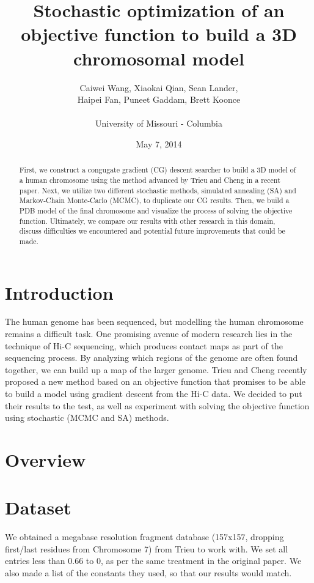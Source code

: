 \documentclass{article}
\title{Stochastic optimization of an objective function to build a 3D chromosomal model}
\author{Caiwei Wang, Xiaokai Qian, Sean Lander, \\Haipei Fan, Puneet Gaddam, Brett Koonce\\\\University of Missouri - Columbia}
\date{May 7, 2014}
\begin{document}
\maketitle

\renewcommand{\abstractname}{}
\begin{abstract}

First, we construct a congugate gradient (CG) descent searcher to build a 3D model of a human chromosome using the method advanced by Trieu and Cheng in a recent paper.  Next, we utilize two different stochastic methods, simulated annealing (SA) and Markov-Chain Monte-Carlo (MCMC), to duplicate our CG results.  Then, we build a PDB model of the final chromosome and visualize the process of solving the objective function.  Ultimately, we compare our results with other research in this domain, discuss difficulties we encountered and potential future improvements that could be made.

\end{abstract}

\section{Introduction}

The human genome has been sequenced, but modelling the human chromosome remains a difficult task.  One promising avenue of modern research lies in the technique of Hi-C sequencing, which produces contact maps as part of the sequencing process.  By analyzing which regions of the genome are often found together, we can build up a map of the larger genome.  Trieu and Cheng recently proposed a new method based on an objective function that promises to be able to build a model using gradient descent from the Hi-C data.  We decided to put their results to the test, as well as experiment with solving the objective function using stochastic (MCMC and SA) methods.

\section{Overview}



\section{Dataset}

We obtained a megabase resolution fragment database (157x157, dropping first/last residues from Chromosome 7) from Trieu to work with.  We set all entries less than 0.66 to 0, as per the same treatment in the original paper.  We also made a list of the constants they used, so that our results would match.
\end{document}
